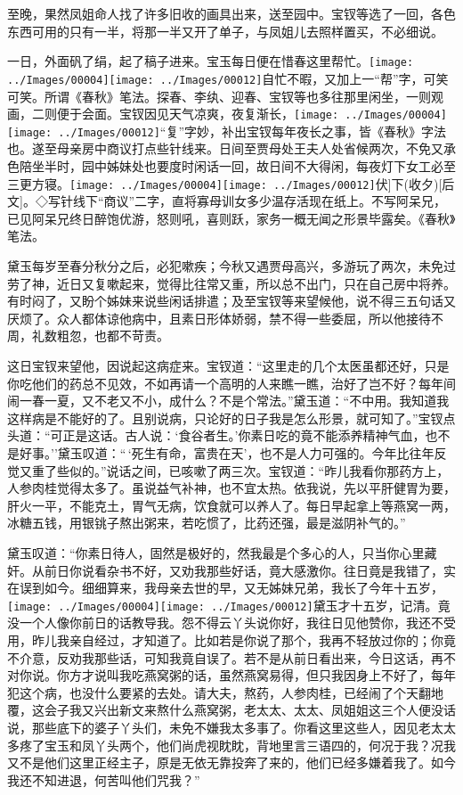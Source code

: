 至晚，果然凤姐命人找了许多旧收的画具出来，送至园中。宝钗等选了一回，各色东西可用的只有一半，将那一半又开了单子，与凤姐儿去照样置买，不必细说。

一日，外面矾了绢，起了稿子进来。宝玉每日便在惜春这里帮忙。{\texttt{[image: ../Images/00004]}\texttt{[image: ../Images/00012]}\footnotesize \kaishu 自忙不暇，又加上一``帮''字，可笑可笑。所谓《春秋》笔法。}探春、李纨、迎春、宝钗等也多往那里闲坐，一则观画，二则便于会面。宝钗因见天气凉爽，夜复渐长，{\texttt{[image: ../Images/00004]}\texttt{[image: ../Images/00012]}\footnotesize \kaishu ``复''字妙，补出宝钗每年夜长之事，皆《春秋》字法也。}遂至母亲房中商议打点些针线来。日间至贾母处王夫人处省候两次，不免又承色陪坐半时，园中姊妹处也要度时闲话一回，故日间不大得闲，每夜灯下女工必至三更方寝。{\texttt{[image: ../Images/00004]}\texttt{[image: ../Images/00012]}\footnotesize \kaishu {(代)}{[}伏{]}下{(收夕)}{[}后文{]}。◇写针线下``商议''二字，直将寡母训女多少温存活现在纸上。不写阿呆兄，已见阿呆兄终日醉饱优游，怒则吼，喜则跃，家务一概无闻之形景毕露矣。《春秋》笔法。}

黛玉每岁至春分秋分之后，必犯嗽疾；今秋又遇贾母高兴，多游玩了两次，未免过劳了神，近日又复嗽起来，觉得比往常又重，所以总不出门，只在自己房中将养。有时闷了，又盼个姊妹来说些闲话排遣；及至宝钗等来望候他，说不得三五句话又厌烦了。众人都体谅他病中，且素日形体娇弱，禁不得一些委屈，所以他接待不周，礼数粗忽，也都不苛责。

这日宝钗来望他，因说起这病症来。宝钗道：``这里走的几个太医虽都还好，只是你吃他们的药总不见效，不如再请一个高明的人来瞧一瞧，治好了岂不好？每年间闹一春一夏，又不老又不小，成什么？不是个常法。''黛玉道：``不中用。我知道我这样病是不能好的了。且别说病，只论好的日子我是怎么形景，就可知了。''宝钗点头道：``可正是这话。古人说：`食谷者生。'你素日吃的竟不能添养精神气血，也不是好事。''黛玉叹道：``\,`死生有命，富贵在天'，也不是人力可强的。今年比往年反觉又重了些似的。''说话之间，已咳嗽了两三次。宝钗道：``昨儿我看你那药方上，人参肉桂觉得太多了。虽说益气补神，也不宜太热。依我说，先以平肝健胃为要，肝火一平，不能克土，胃气无病，饮食就可以养人了。每日早起拿上等燕窝一两，冰糖五钱，用银铫子熬出粥来，若吃惯了，比药还强，最是滋阴补气的。''

黛玉叹道：``你素日待人，固然是极好的，然我最是个多心的人，只当你心里藏奸。从前日你说看杂书不好，又劝我那些好话，竟大感激你。往日竟是我错了，实在误到如今。细细算来，我母亲去世的早，又无姊妹兄弟，我长了今年十五岁，{\texttt{[image: ../Images/00004]}\texttt{[image: ../Images/00012]}\footnotesize \kaishu 黛玉才十五岁，记清。}竟没一个人像你前日的话教导我。怨不得云丫头说你好，我往日见他赞你，我还不受用，昨儿我亲自经过，才知道了。比如若是你说了那个，我再不轻放过你的；你竟不介意，反劝我那些话，可知我竟自误了。若不是从前日看出来，今日这话，再不对你说。你方才说叫我吃燕窝粥的话，虽然燕窝易得，但只我因身上不好了，每年犯这个病，也没什么要紧的去处。请大夫，熬药，人参肉桂，已经闹了个天翻地覆，这会子我又兴出新文来熬什么燕窝粥，老太太、太太、凤姐姐这三个人便没话说，那些底下的婆子丫头们，未免不嫌我太多事了。你看这里这些人，因见老太太多疼了宝玉和凤丫头两个，他们尚虎视眈眈，背地里言三语四的，何况于我？况我又不是他们这里正经主子，原是无依无靠投奔了来的，他们已经多嫌着我了。如今我还不知进退，何苦叫他们咒我？''

